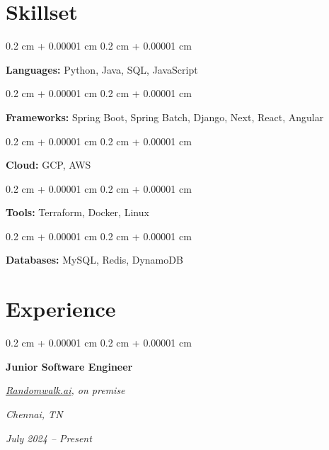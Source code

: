 \documentclass[10pt, letterpaper]{article}
\newenvironment{onecolentry}{
    \begin{adjustwidth}{
        0.2 cm + 0.00001 cm
    }{
        0.2 cm + 0.00001 cm
    }
}{
    \end{adjustwidth}
} %
\newenvironment{twocolentry}[2][]{
    \onecolentry
    \def\secondColumn{#2}
    \setcolumnwidth{\fill, 4.5 cm}
    \begin{paracol}{2}
}{
    \switchcolumn\raggedleft\secondColumn
    \end{paracol}
    \endonecolentry
} %
\let\hrefWithoutArrow\href
\renewcommand{\href}[2]{\hrefWithoutArrow{#1}{\ifthenelse{\equal{#2}{}}{ }{#2 }\raisebox{.15ex}{\footnotesize \faExternalLink*}}}
\begin{document}
\section{Skillset}

\begin{onecolentry}
    \textbf{Languages:} Python, Java, SQL, JavaScript
\end{onecolentry}
\vspace{0.10 cm}

\begin{onecolentry}
    \textbf{Frameworks:} Spring Boot, Spring Batch, Django, Next, React, Angular
\end{onecolentry}
\vspace{0.10 cm}

\begin{onecolentry}
    \textbf{Cloud:} GCP, AWS
\end{onecolentry}
\vspace{0.10 cm}

\begin{onecolentry}
    \textbf{Tools:} Terraform, Docker, Linux
\end{onecolentry}
\vspace{0.10 cm}

\begin{onecolentry}
    \textbf{Databases:} MySQL, Redis, DynamoDB
\end{onecolentry}
\vspace{0.10 cm}

\section{Experience}

\begin{twocolentry}{
        \textit{Chennai, TN}

        \textit{July 2024 – Present}}
    \textbf{Junior Software Engineer}

    \textit{{\hrefWithoutArrow{https://randomwalk.ai/}{\color{black}\hspace*{0.13cm}Randomwalk.ai}}, on premise}
\end{twocolentry}
\end{document}
